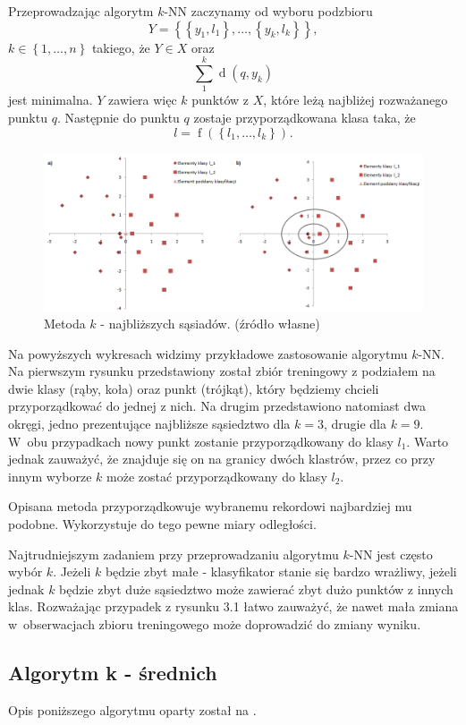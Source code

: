 \documentclass[12pt,a4paper]{report}
\newcommand{\set}[1]{\left\lbrace {#1} \right\rbrace}
\newcommand{\distance}[2]{\operatorname{d}\left({#1}, {#2} \right)}
\newcommand{\f}[2][]{\operatorname{f}\left( {#2} \right)_{#1}}
\begin{document}
Przeprowadzając algorytm $k$-NN zaczynamy od wyboru podzbioru
$$
\mathit{Y}=\set{\set{y_1,l_1},\ldots,\set{y_k,l_k}}, 
$$
$k\in\set{1,\ldots,n}$ takiego, że $\mathit{Y} \in \mathit{X}$ oraz 
$$
\sum_1^k \distance{q}{y_k}
$$ 
jest minimalna. $\mathit{Y}$ zawiera więc $k$ punktów z $\mathit{X}$, które leżą najbliżej rozważanego punktu $q$. Następnie do punktu $q$ zostaje przyporządkowana klasa taka, że $$
l=\f{\set{l_1,\ldots,l_k}}.
$$
\begin{center}
\begin{figure}[H]
\centering
\includegraphics[scale=0.5]{obrazy/kNN.PNG} 
\caption{Metoda $k$ - najbliższych sąsiadów. (źródło własne)}
\end{figure}
\end{center}

Na powyższych wykresach widzimy przykładowe zastosowanie algorytmu $k$-NN. Na pierwszym rysunku przedstawiony został zbiór treningowy z podziałem na dwie klasy (rąby, koła) oraz punkt (trójkąt), który będziemy chcieli przyporządkować do jednej z nich. Na drugim przedstawiono natomiast dwa okręgi, jedno prezentujące najbliższe sąsiedztwo dla $k = 3$, drugie dla $k = 9$. W~obu przypadkach nowy punkt zostanie przyporządkowany do klasy $l_1$. Warto jednak zauważyć, że znajduje się on na granicy dwóch klastrów, przez co przy innym wyborze $k$ może zostać przyporządkowany do klasy $l_2$.

Opisana metoda przyporządkowuje wybranemu rekordowi najbardziej mu podobne. Wykorzystuje do tego pewne miary odległości.

Najtrudniejszym zadaniem przy przeprowadzaniu algorytmu $k$-NN jest często wybór $k$. Jeżeli $k$ będzie zbyt małe - klasyfikator stanie się bardzo wrażliwy, jeżeli jednak $k$ będzie zbyt duże sąsiedztwo może zawierać zbyt dużo punktów z innych klas. Rozważając przypadek z rysunku 3.1 łatwo zauważyć, że nawet mała zmiana w~obserwacjach zbioru treningowego może doprowadzić do zmiany wyniku.

\subsection{Algorytm k - średnich} 
Opis poniższego algorytmu oparty został na {\citep[Sec 2.3.1]{ascgdpds}}.
\end{document}
